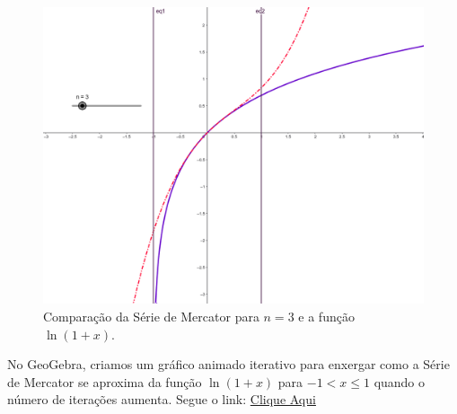 \begin{figure}[H]
    \centering
    \includegraphics[width=\linewidth]{img/image.png}
    \caption{Comparação da Série de Mercator para $n=3$ e a função $\ln (1+x)$.}
\end{figure}

No GeoGebra, criamos um gráfico animado iterativo para enxergar como a Série de Mercator se aproxima da função $\ln (1+x)$ para $-1< x \le 1$ quando o número de iterações aumenta. Segue o link: 
\href{https://www.geogebra.org/calculator/jyycuaxp}{Clique Aqui}

